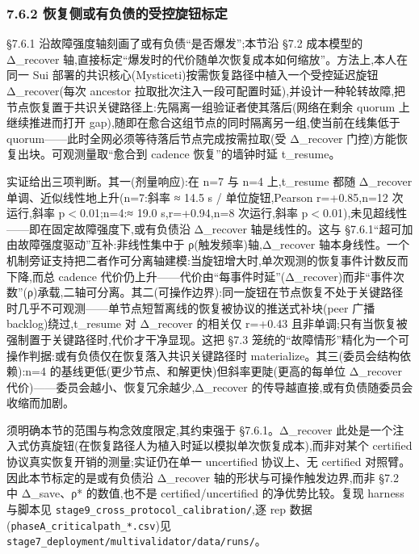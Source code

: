 \documentclass[UTF8,fontset=windows,a4paper,11pt]{ctexart}
\begin{document}
\subsubsection{7.6.2
恢复侧或有负债的受控旋钮标定}\label{ux6062ux590dux4fa7ux6216ux6709ux8d1fux503aux7684ux53d7ux63a7ux65cbux94aeux6807ux5b9a}

§7.6.1 沿故障强度轴刻画了或有负债``是否爆发'';本节沿 §7.2 成本模型的
Δ\_recover
轴,直接标定``爆发时的代价随单次恢复成本如何缩放''。方法上,本人在同一 Sui
部署的共识核心(Mysticeti)按需恢复路径中植入一个受控延迟旋钮
Δ\_recover(每次 ancestor
拉取批次注入一段可配置时延),并设计一种轮转故障,把节点恢复置于共识关键路径上:先隔离一组验证者使其落后(网络在剩余
quorum 上继续推进而打开
gap),随即在愈合这组节点的同时隔离另一组,使当前在线集低于
quorum------此时全网必须等待落后节点完成按需拉取(受 Δ\_recover
门控)方能恢复出块。可观测量取``愈合到 cadence 恢复''的墙钟时延
t\_resume。

实证给出三项判断。其一(剂量响应):在 n=7 与 n=4 上,t\_resume 都随
Δ\_recover 单调、近似线性地上升(n=7:斜率 ≈ 14.5 s / 单位旋钮,Pearson
r=+0.85,n=12 次运行,斜率 p$<$0.01;n=4:≈ 19.0
s,r=+0.94,n=8 次运行,斜率 p$<$0.01),未见超线性------即在固定故障强度下,或有负债沿 Δ\_recover
轴是线性的。这与 §7.6.1``超可加由故障强度驱动''互补:非线性集中于
ρ(触发频率)轴,Δ\_recover
轴本身线性。一个机制旁证支持把二者作可分离轴建模:当旋钮增大时,单次观测的恢复事件计数反而下降,而总
cadence
代价仍上升------代价由``每事件时延''(Δ\_recover)而非``事件次数''(ρ)承载,二轴可分离。其二(可操作边界):同一旋钮在节点恢复不处于关键路径时几乎不可观测------单节点短暂离线的恢复被协议的推送式补块(peer
广播 backlog)绕过,t\_resume 对 Δ\_recover 的相关仅 r=+0.43
且非单调;只有当恢复被强制置于关键路径时,代价才干净显现。这把 §7.3
笼统的``故障情形''精化为一个可操作判据:或有负债仅在恢复落入共识关键路径时
materialize。其三(委员会结构依赖):n=4
的基线更低(更少节点、和解更快)但斜率更陡(更高的每单位 Δ\_recover
代价)------委员会越小、恢复冗余越少,Δ\_recover
的传导越直接,或有负债随委员会收缩而加剧。

须明确本节的范围与构念效度限定,其约束强于 §7.6.1。Δ\_recover
此处是一个注入式仿真旋钮(在恢复路径人为植入时延以模拟单次恢复成本),而非对某个
certified 协议真实恢复开销的测量;实证仍在单一 uncertified 协议上、无
certified 对照臂。因此本节标定的是或有负债沿 Δ\_recover
轴的形状与可操作触发边界,而非 §7.2 中 Δ\_save、ρ* 的数值,也不是
certified/uncertified 的净优势比较。复现 harness 与脚本见
\texttt{stage9\_\allowbreak{}cross\_\allowbreak{}protocol\_\allowbreak{}calibration/\allowbreak{}},逐 rep
数据(\texttt{phaseA\_\allowbreak{}criticalpath\_\allowbreak{}*.\allowbreak{}csv})见
\texttt{stage7\_\allowbreak{}deployment/\allowbreak{}multivalidator/\allowbreak{}data/\allowbreak{}runs/\allowbreak{}}。
\end{document}
